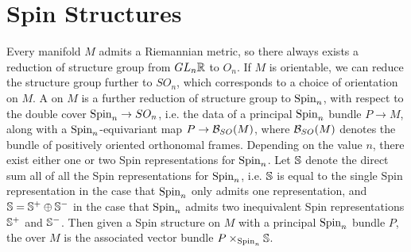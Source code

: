 %
\section{Spin Structures}
%
Every manifold $M$ admits a Riemannian metric, so there always exists a
reduction of structure group from $GL_n\R$ to $O_n$. If $M$ is orientable,
we can reduce the structure group further to $SO_n$, which corresponds to a
choice of orientation on $M$. A  on $M$
is a further reduction of structure group to $\Spin_n$, with respect to the
double cover $\Spin_n \to SO_n$, i.e. the data of a principal $\Spin_n$ bundle
$P \to M$, along with a $\Spin_n$-equivariant map $P \to \B_{SO}(M)$, where
$\B_{SO}(M)$ denotes the bundle of positively oriented orthonomal frames.
Depending on the value $n$, there exist either one or two Spin representations
for $\Spin_n$. Let $\S$ denote the direct sum all of all the Spin representations
for $\Spin_n$, i.e. $\S$ is equal to the single Spin representation in the
case that $\Spin_n$ only admits one representation, and $\S = \S^+ \oplus \S^-$
in the case that $\Spin_n$ admits two inequivalent Spin representations $\S^+$
and $\S^-$. Then given a Spin structure on $M$ with a principal $\Spin_n$ bundle
$P$, the  over $M$ is the associated vector bundle
$P \times_{\Spin_n} \S$.
%

